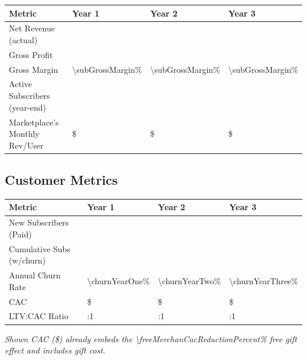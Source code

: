 \begin{table}[H]
\centering
\begin{tabularx}{\linewidth}{l Y Y Y}
\toprule
Metric & Year 1 & Year 2 & Year 3 \\\midrule
Net Revenue (actual) & \numint{\actualSubRevenueYearOne} & \numint{\actualSubRevenueYearTwo} & \numint{\actualSubRevenueYearThree} \\
Gross Profit & \numint{\grossProfitYearOne} & \numint{\grossProfitYearTwo} & \numint{\grossProfitYearThree} \\
Gross Margin & \num{\subGrossMargin}\% & \num{\subGrossMargin}\% & \num{\subGrossMargin}\% \\
Active Subscribers (year-end) & \numint{\totalSubsYearOne} & \numint{\totalSubsYearTwo} & \numint{\totalSubsYearThree} \\
Marketplace's Monthly Rev/User & \$\numfpeval{\markWeightedAvgMonthly} & \$\numfpeval{\markWeightedAvgMonthly} & \$\numfpeval{\markWeightedAvgMonthly} \\
\bottomrule
\end{tabularx}
\end{table}

\subsection{Customer Metrics}
\begin{table}[H]
\centering
\begin{tabularx}{\linewidth}{l Y Y Y}
\toprule
Metric & Year 1 & Year 2 & Year 3 \\\midrule
New Subscribers (Paid) & \numint{\newSubsYearOne} & \numint{\newSubsYearTwo} & \numint{\newSubsYearThree} \\
Cumulative Subs (w/churn) & \numint{\totalSubsYearOne} & \numint{\totalSubsYearTwo} & \numint{\totalSubsYearThree} \\
Annual Churn Rate & \num{\churnYearOne}\% & \num{\churnYearTwo}\% & \num{\churnYearThree}\% \\
CAC & \$\numint{\cacDigital} & \$\numint{\cacDigital} & \$\numint{\cacDigital} \\
LTV:CAC Ratio & \numint{\ltvCacRatio}:1 & \numint{\ltvCacRatio}:1 & \numint{\ltvCacRatio}:1 \\
\bottomrule
\end{tabularx}
\end{table}

\noindent\textit{Shown CAC (\$\numint{\cacDigital}) already embeds the \num{\freeMerchanCacReductionPercent}\% free gift effect and includes gift cost\cite{snappy2024}.}

